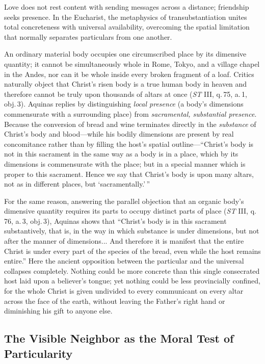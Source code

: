 Love does not rest content with sending messages across a distance; friendship seeks presence. In the Eucharist, the metaphysics of transubstantiation unites total concreteness with universal availability, overcoming the spatial limitation that normally separates particulars from one another.

An ordinary material body occupies one circumscribed place by its dimensive quantity; it cannot be simultaneously whole in Rome, Tokyo, and a village chapel in the Andes, nor can it be whole inside every broken fragment of a loaf. Critics naturally object that Christ's risen body is a true human body in heaven and therefore cannot be truly upon thousands of altars at once (\textit{ST} III, q.\,75, a.\,1, obj.\,3). Aquinas replies by distinguishing \emph{local presence} (a body's dimensions commensurate with a surrounding place) from \emph{sacramental, substantial presence}. Because the conversion of bread and wine terminates directly in the \emph{substance} of Christ's body and blood---while his bodily dimensions are present by real concomitance rather than by filling the host's spatial outline---``Christ's body is not in this sacrament in the same way as a body is in a place, which by its dimensions is commensurate with the place; but in a special manner which is proper to this sacrament. Hence we say that Christ's body is upon many altars, not as in different places, but `sacramentally.'\,''

For the same reason, answering the parallel objection that an organic body's dimensive quantity requires its parts to occupy distinct parts of place (\textit{ST} III, q.\,76, a.\,3, obj.\,3), Aquinas shows that ``Christ's body is in this sacrament substantively, that is, in the way in which substance is under dimensions, but not after the manner of dimensions... And therefore it is manifest that the entire Christ is under every part of the species of the bread, even while the host remains entire.'' Here the ancient opposition between the particular and the universal collapses completely. Nothing could be more concrete than this single consecrated host laid upon a believer's tongue; yet nothing could be less provincially confined, for the whole Christ is given undivided to every communicant on every altar across the face of the earth, without leaving the Father's right hand or diminishing his gift to anyone else.

\subsection{The Visible Neighbor as the Moral Test of Particularity}

